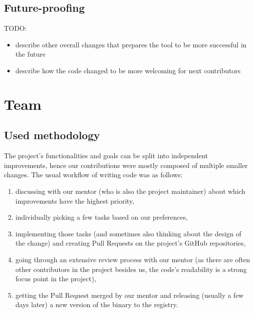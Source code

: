 \documentclass[licencjacka,en]{pracamgr}
\begin{document}
\section{Future-proofing}

TODO:
\begin{itemize}
	\item describe other overall changes that prepares the tool to be more successful in the future
	\item describe how the code changed to be more welcoming for next contributors
\end{itemize}


\chapter{Team}\label{r:chapter_team}

\section{Used methodology}

The project's functionalities and goals can be split into independent improvements, hence our
contributions were mostly composed of multiple smaller changes. The usual workflow of writing
code was as follows:
\begin{enumerate}
	\item discussing with our mentor (who is also the project maintainer) about which improvements
		have the highest priority,
	\item individually picking a few tasks based on our preferences,
	\item implementing those tasks (and sometimes also thinking about the design of the change)
		and creating Pull Requests on the project's GitHub repositories,
	\item going through an extensive review process with our mentor (as there are often other
		contributors in the project besides us, the code's readability is a strong focus point
		in the project),
	\item getting the Pull Request merged by our mentor and releasing (usually a few days later)
		a new version of the binary to the registry.
\end{enumerate}
\end{document}
